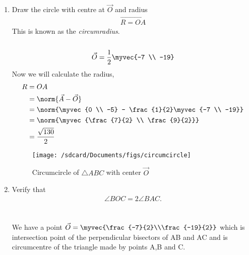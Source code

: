 \documentclass[11pt]{book}
\begin{document}
\begin{enumerate}[label=\thesection.\arabic*.,ref=\thesection.\theenumi]
	\item Draw the circle with centre at $\vec{O}$ and radius 
		\begin{align}
			\vec{R = OA}
		\end{align}
		This is known as the {\em circumradius}. \\
  \solution\\
  \begin{align}
\vec{O} = \frac{1}{2}\myvec{-7 \\ -19}
\end{align}
Now we will calculate the radius,
\begin{align}
      R &= OA\\
        &= \norm{\vec{A} - \vec{O}}\\
        &= \norm{\myvec{0 \\ -5} - \frac{1}{2}\myvec{-7 \\ -19}}\\
        &= \norm{\myvec{\frac{7}{2} \\ \frac{9}{2}}}\\
        &= \frac{\sqrt{130}}{2}
\end{align}
\begin{figure}[H]                                                                                                \texttt{[image: /sdcard/Documents/figs/circumcircle]}
        \caption{Circumcircle of $\triangle ABC$ with center $\vec{O}$}
\label{fig:circumcircle}
\end{figure}

\item Verify that 
		\begin{align}
			\angle BOC = 2\angle BAC.
		\end{align}\\
\solution\\
We have a point $\vec{O}=\myvec{\frac{-7}{2}\\\frac{-19}{2}}$
which is intersection point of the perpendicular bisectors of AB and AC and is circumcentre of the triangle made by points A,B and C.


\end{enumerate}
\end{document}
